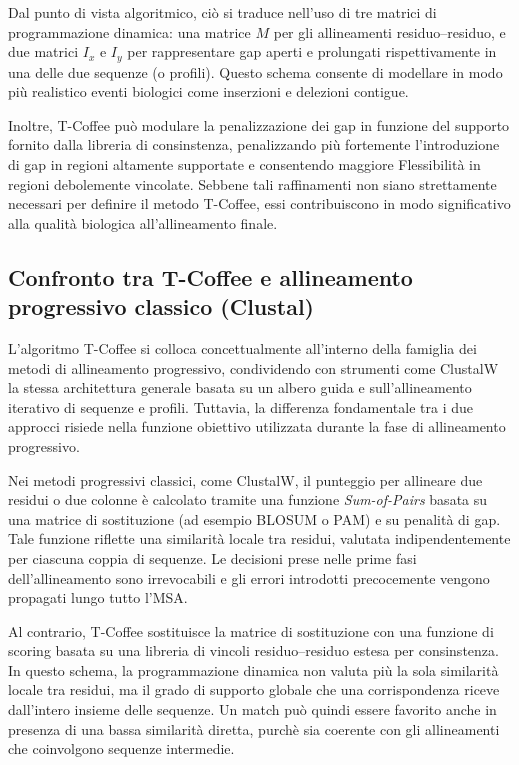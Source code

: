Dal punto di vista algoritmico, ciò si traduce nell'uso di tre matrici 
di programmazione dinamica: una matrice $M$ per gli allineamenti
residuo--residuo, e due matrici $I_x$ e $I_y$ per rappresentare gap 
aperti e prolungati rispettivamente in una delle due sequenze (o profili).
Questo schema consente di modellare in modo più realistico eventi biologici
come inserzioni e delezioni contigue.

Inoltre, T-Coffee può modulare la penalizzazione dei gap in funzione
del supporto fornito dalla libreria di consinstenza, penalizzando più fortemente l'introduzione
di gap in regioni altamente supportate e consentendo maggiore Flessibilità 
in regioni debolemente vincolate.
Sebbene tali raffinamenti non siano strettamente necessari per definire
il metodo T-Coffee, essi contribuiscono in modo significativo alla qualità biologica 
all'allineamento finale.

\subsection{Confronto tra T-Coffee e allineamento progressivo classico (Clustal)}
L'algoritmo T-Coffee si colloca concettualmente all'interno della famiglia
dei metodi di allineamento progressivo, condividendo con strumenti come 
ClustalW la stessa architettura generale basata su un albero guida e
sull'allineamento iterativo di sequenze e profili. Tuttavia, la differenza
fondamentale tra i due approcci risiede nella funzione obiettivo utilizzata
durante la fase di allineamento progressivo.

Nei metodi progressivi classici, come ClustalW, il punteggio per allineare
due residui o due colonne è calcolato tramite una funzione \emph{Sum-of-Pairs}
basata su una matrice di sostituzione (ad esempio BLOSUM o PAM) e su penalità
di gap. Tale funzione riflette una similarità locale tra residui, valutata indipendentemente 
per ciascuna coppia di sequenze. Le decisioni prese nelle prime fasi dell'allineamento
sono irrevocabili e gli errori introdotti precocemente vengono propagati lungo 
tutto l'MSA.

Al contrario, T-Coffee sostituisce la matrice di sostituzione con una funzione
di scoring basata su una libreria di vincoli residuo--residuo estesa per 
consinstenza. In questo schema, la programmazione dinamica non valuta più 
la sola similarità locale tra residui, ma il grado di supporto globale che
una corrispondenza riceve dall'intero insieme delle sequenze. Un match può 
quindi essere favorito anche in presenza di una bassa similarità diretta,
purchè sia coerente con gli allineamenti che coinvolgono sequenze intermedie.

